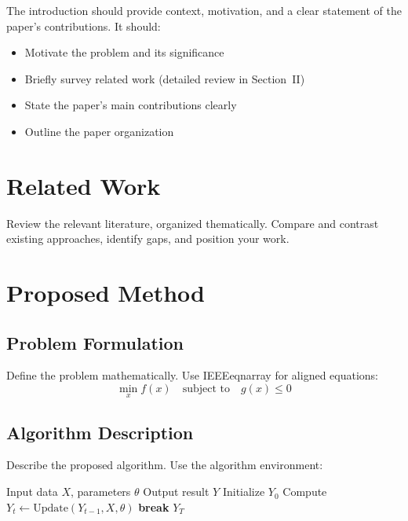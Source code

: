 \documentclass[journal]{IEEEtran}
\begin{document}
The introduction should provide context, motivation, and a clear
statement of the paper's contributions. It should:

\begin{itemize}
  \item Motivate the problem and its significance
  \item Briefly survey related work (detailed review in Section~II)
  \item State the paper's main contributions clearly
  \item Outline the paper organization
\end{itemize}

\section{Related Work}

Review the relevant literature, organized thematically. Compare and
contrast existing approaches, identify gaps, and position your work.

\section{Proposed Method}

\subsection{Problem Formulation}

Define the problem mathematically. Use IEEEeqnarray for aligned equations:
\begin{equation}
  \min_{x} f(x) \quad \text{subject to} \quad g(x) \leq 0
  \label{eq:objective}
\end{equation}

\subsection{Algorithm Description}

Describe the proposed algorithm. Use the algorithm environment:

\begin{algorithm}[t]
\caption{Algorithm Name}
\label{alg:algorithm}
\begin{algorithmic}[1]
  \REQUIRE Input data $X$, parameters $\theta$
  \ENSURE Output result $Y$
  \STATE Initialize $Y_0$
    \STATE Compute $Y_t \leftarrow \text{Update}(Y_{t-1}, X, \theta)$
      \STATE \textbf{break}
    \ENDIF
  \ENDFOR
  \RETURN $Y_T$
\end{algorithmic}
\end{algorithm}
\end{document}
